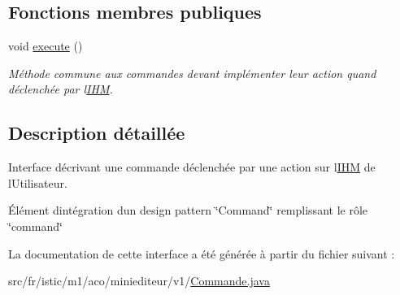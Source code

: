 \subsection*{Fonctions membres publiques}
\begin{DoxyCompactItemize}
\item 
\mbox{\label{interfacefr_1_1istic_1_1m1_1_1aco_1_1miniediteur_1_1v1_1_1Commande_a87a8a55bac4e81e32339248f79f7de4f}} 
void \hyperlink{interfacefr_1_1istic_1_1m1_1_1aco_1_1miniediteur_1_1v1_1_1Commande_a87a8a55bac4e81e32339248f79f7de4f}{execute} ()
\begin{DoxyCompactList}\small\item\em Méthode commune aux commandes devant implémenter leur action quand déclenchée par l\textquotesingle{}\hyperlink{interfacefr_1_1istic_1_1m1_1_1aco_1_1miniediteur_1_1v1_1_1IHM}{I\+HM}. \end{DoxyCompactList}\end{DoxyCompactItemize}


\subsection{Description détaillée}
Interface décrivant une commande déclenchée par une action sur l\textquotesingle{}\hyperlink{interfacefr_1_1istic_1_1m1_1_1aco_1_1miniediteur_1_1v1_1_1IHM}{I\+HM} de l\textquotesingle{}Utilisateur. 

Élément d\textquotesingle{}intégration d\textquotesingle{}un design pattern \char`\"{}\+Command\char`\"{} remplissant le rôle \char`\"{}command\char`\"{} 

La documentation de cette interface a été générée à partir du fichier suivant \+:\begin{DoxyCompactItemize}
\item 
src/fr/istic/m1/aco/miniediteur/v1/\hyperlink{Commande_8java}{Commande.\+java}\end{DoxyCompactItemize}
